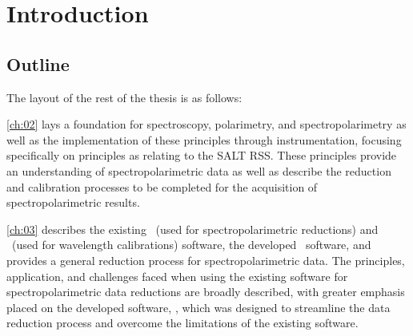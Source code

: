 \chapter{Introduction} \label{ch:01}






\section{Outline}

\noindent The layout of the rest of the thesis is as follows:

\autoref{ch:02} lays a foundation for spectroscopy, polarimetry, and spectropolarimetry as well as the implementation of these principles through instrumentation, focusing specifically on principles as relating to the \gls{SALT} \gls{RSS}.
These principles provide an understanding of spectropolarimetric data as well as describe the reduction and calibration processes to be completed for the acquisition of spectropolarimetric results.

\autoref{ch:03} describes the existing \polsalt\ (used for spectropolarimetric reductions) and \iraf\ (used for wavelength calibrations) software, the developed \stops\ software, and provides a general reduction process for spectropolarimetric data.
The principles, application, and challenges faced when using the existing software for spectropolarimetric data reductions are broadly described, with greater emphasis placed on the developed software, \stops, which was designed to streamline the data reduction process and overcome the limitations of the existing software.

